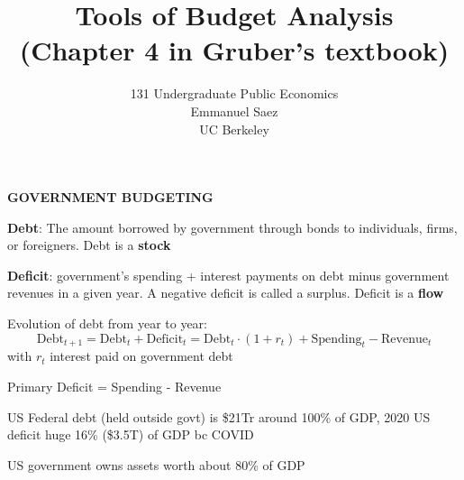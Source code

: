 \documentclass[landscape]{slides}
\author{131 Undergraduate Public Economics \\ Emmanuel Saez \\ UC Berkeley}
\date{}
\title{Tools of Budget Analysis \\ (Chapter 4 in Gruber's textbook)} \onlyslides{1-300}
\begin{document}
\begin{slide}
\maketitle
\end{slide}

%
%
%
%
%


\begin{slide}
\begin{center}
{\bf GOVERNMENT BUDGETING}
\end{center}

{\bf Debt}:
The amount borrowed by government through bonds to individuals, firms, or foreigners. Debt is a \textbf{stock}

{\bf Deficit}: government's spending + interest payments on debt minus
government revenues in a given year.  A negative
deficit is called a surplus. Deficit is a \textbf{flow}

Evolution of debt from year to year:
\[ \text{Debt}_{t+1}=\text{Debt}_t + \text{Deficit}_t = \text{Debt}_t \cdot (1+r_t) + \text{Spending}_t - \text{Revenue}_t \]
with $r_t$ interest paid on government debt

Primary Deficit = Spending - Revenue

US Federal debt (held outside govt) is \$21Tr around 100\% of GDP, 2020 US deficit huge 16\% (\$3.5T) of GDP 
bc COVID

US government owns assets worth about 80\% of GDP

\end{slide}

\begin{slide}

\end{slide}

\begin{slide}

\end{slide}
\end{document}
